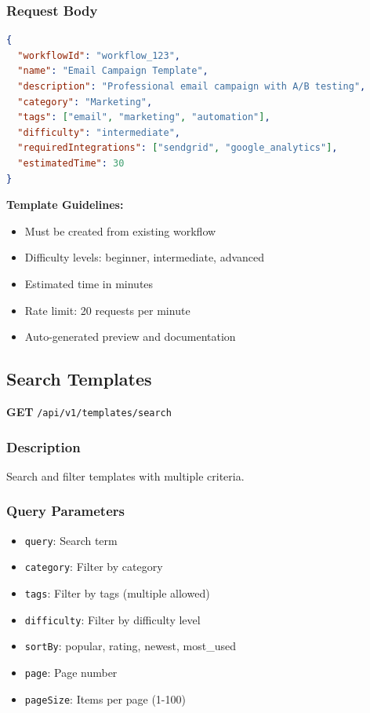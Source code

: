 \documentclass[11pt,a4paper]{report}
\begin{document}
\subsubsection{Request Body}
\begin{lstlisting}[style=jsoncode,language=json]
{
  "workflowId": "workflow_123",
  "name": "Email Campaign Template",
  "description": "Professional email campaign with A/B testing",
  "category": "Marketing",
  "tags": ["email", "marketing", "automation"],
  "difficulty": "intermediate",
  "requiredIntegrations": ["sendgrid", "google_analytics"],
  "estimatedTime": 30
}
\end{lstlisting}

\begin{infobox}
\textbf{Template Guidelines:}
\begin{itemize}[leftmargin=*]
    \item Must be created from existing workflow
    \item Difficulty levels: beginner, intermediate, advanced
    \item Estimated time in minutes
    \item Rate limit: 20 requests per minute
    \item Auto-generated preview and documentation
\end{itemize}
\end{infobox}

\subsection{Search Templates}

\textbf{GET} \texttt{/api/v1/templates/search}

\subsubsection{Description}
Search and filter templates with multiple criteria.

\subsubsection{Query Parameters}
\begin{itemize}[leftmargin=*]
    \item \texttt{query}: Search term
    \item \texttt{category}: Filter by category
    \item \texttt{tags}: Filter by tags (multiple allowed)
    \item \texttt{difficulty}: Filter by difficulty level
    \item \texttt{sortBy}: popular, rating, newest, most\_used
    \item \texttt{page}: Page number
    \item \texttt{pageSize}: Items per page (1-100)
\end{itemize}
\end{document}
